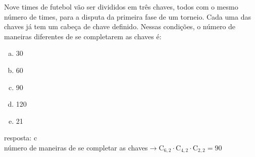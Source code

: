 \begin{ex}
 Nove times de futebol vão ser divididos em três chaves, todos com o mesmo número de times, para a disputa da primeira fase de um torneio. Cada uma das chaves já tem um cabeça de chave definido. Nessas condições, o número de maneiras diferentes de se completarem as chaves é:
    \begin{enumerate}[(a)]
    \item 30
    \item 60
    \item 90
    \item 120
    \item 21
    \end{enumerate}
      \begin{sol}
        resposta: c \\
        número de maneiras de se completar as chaves$\rightarrow\mathrm{C}_{6,2}\cdot\mathrm{C}_{4,2}\cdot\mathrm{C}_{2,2}=90$
      \end{sol}
\end{ex}